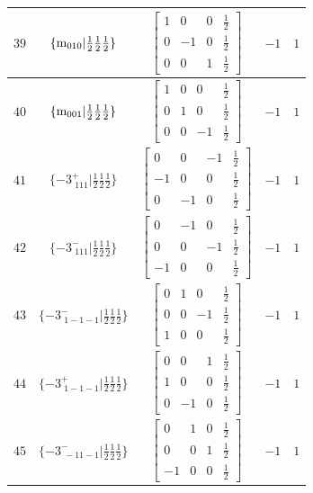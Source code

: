 \documentclass[fleqn,8pt]{jsarticle}
\begin{document}
\begin{longtable}{ccccc}
$ 39 $ & $ \{{\rm m}_{010}|\frac{1}{2} \frac{1}{2} \frac{1}{2}\} $ & $ \begin{bmatrix} 1 & 0 & 0 & \frac{1}{2} \\ 0 & -1 & 0 & \frac{1}{2} \\ 0 & 0 & 1 & \frac{1}{2} \end{bmatrix} $ & $ -1 $ & $ 1 $ \\ \hline
$ 40 $ & $ \{{\rm m}_{001}|\frac{1}{2} \frac{1}{2} \frac{1}{2}\} $ & $ \begin{bmatrix} 1 & 0 & 0 & \frac{1}{2} \\ 0 & 1 & 0 & \frac{1}{2} \\ 0 & 0 & -1 & \frac{1}{2} \end{bmatrix} $ & $ -1 $ & $ 1 $ \\ \hline
$ 41 $ & $ \{-3^{+}_{\,\,111}|\frac{1}{2} \frac{1}{2} \frac{1}{2}\} $ & $ \begin{bmatrix} 0 & 0 & -1 & \frac{1}{2} \\ -1 & 0 & 0 & \frac{1}{2} \\ 0 & -1 & 0 & \frac{1}{2} \end{bmatrix} $ & $ -1 $ & $ 1 $ \\ \hline
$ 42 $ & $ \{-3^{-}_{\,\,111}|\frac{1}{2} \frac{1}{2} \frac{1}{2}\} $ & $ \begin{bmatrix} 0 & -1 & 0 & \frac{1}{2} \\ 0 & 0 & -1 & \frac{1}{2} \\ -1 & 0 & 0 & \frac{1}{2} \end{bmatrix} $ & $ -1 $ & $ 1 $ \\ \hline
$ 43 $ & $ \{-3^{-}_{\,\,1-1-1}|\frac{1}{2} \frac{1}{2} \frac{1}{2}\} $ & $ \begin{bmatrix} 0 & 1 & 0 & \frac{1}{2} \\ 0 & 0 & -1 & \frac{1}{2} \\ 1 & 0 & 0 & \frac{1}{2} \end{bmatrix} $ & $ -1 $ & $ 1 $ \\ \hline
$ 44 $ & $ \{-3^{+}_{\,\,1-1-1}|\frac{1}{2} \frac{1}{2} \frac{1}{2}\} $ & $ \begin{bmatrix} 0 & 0 & 1 & \frac{1}{2} \\ 1 & 0 & 0 & \frac{1}{2} \\ 0 & -1 & 0 & \frac{1}{2} \end{bmatrix} $ & $ -1 $ & $ 1 $ \\ \hline
$ 45 $ & $ \{-3^{-}_{\,\,-11-1}|\frac{1}{2} \frac{1}{2} \frac{1}{2}\} $ & $ \begin{bmatrix} 0 & 1 & 0 & \frac{1}{2} \\ 0 & 0 & 1 & \frac{1}{2} \\ -1 & 0 & 0 & \frac{1}{2} \end{bmatrix} $ & $ -1 $ & $ 1 $ \\ \hline

\end{longtable}
\end{document}
